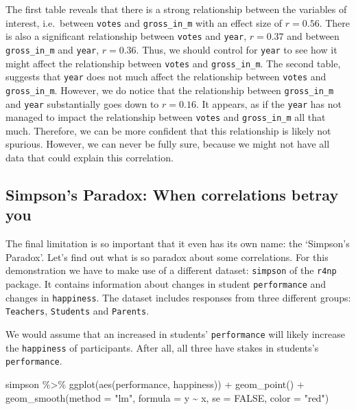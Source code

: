 \documentclass[
]{book}
\newenvironment{Shaded}{\begin{snugshade}}{\end{snugshade}}
\newcommand{\AttributeTok}[1]{\textcolor[rgb]{0.77,0.63,0.00}{#1}}
\newcommand{\ConstantTok}[1]{\textcolor[rgb]{0.00,0.00,0.00}{#1}}
\newcommand{\FunctionTok}[1]{\textcolor[rgb]{0.00,0.00,0.00}{#1}}
\newcommand{\NormalTok}[1]{#1}
\newcommand{\SpecialCharTok}[1]{\textcolor[rgb]{0.00,0.00,0.00}{#1}}
\newcommand{\StringTok}[1]{\textcolor[rgb]{0.31,0.60,0.02}{#1}}
\begin{document}
The first table reveals that there is a strong relationship between the variables of interest, i.e.~between \texttt{votes} and \texttt{gross\_in\_m} with an effect size of \(r = 0.56\). There is also a significant relationship between \texttt{votes} and \texttt{year}, \(r = 0.37\) and between \texttt{gross\_in\_m} and \texttt{year}, \(r = 0.36\). Thus, we should control for \texttt{year} to see how it might affect the relationship between \texttt{votes} and \texttt{gross\_in\_m}. The second table, suggests that \texttt{year} does not much affect the relationship between \texttt{votes} and \texttt{gross\_in\_m}. However, we do notice that the relationship between \texttt{gross\_in\_m} and \texttt{year} substantially goes down to \(r = 0.16\). It appears, as if the \texttt{year} has not managed to impact the relationship between \texttt{votes} and \texttt{gross\_in\_m} all that much. Therefore, we can be more confident that this relationship is likely not spurious. However, we can never be fully sure, because we might not have all data that could explain this correlation.

\hypertarget{simpsons-paradox}{%
\subsection{Simpson's Paradox: When correlations betray you}\label{simpsons-paradox}}

The final limitation is so important that it even has its own name: the `Simpson's Paradox'. Let's find out what is so paradox about some correlations. For this demonstration we have to make use of a different dataset: \texttt{simpson} of the \texttt{r4np} package. It contains information about changes in student \texttt{performance} and changes in \texttt{happiness}. The dataset includes responses from three different groups: \texttt{Teachers}, \texttt{Students} and \texttt{Parents}.

We would assume that an increased in students' \texttt{performance} will likely increase the \texttt{happiness} of participants. After all, all three have stakes in students's \texttt{performance}.

\begin{Shaded}
\begin{Highlighting}[]
\NormalTok{simpson }\SpecialCharTok{\%\textgreater{}\%} 
  \FunctionTok{ggplot}\NormalTok{(}\FunctionTok{aes}\NormalTok{(performance, happiness)) }\SpecialCharTok{+}
  \FunctionTok{geom\_point}\NormalTok{() }\SpecialCharTok{+}
  \FunctionTok{geom\_smooth}\NormalTok{(}\AttributeTok{method =} \StringTok{"lm"}\NormalTok{,}
              \AttributeTok{formula =}\NormalTok{ y }\SpecialCharTok{\textasciitilde{}}\NormalTok{ x,}
              \AttributeTok{se =} \ConstantTok{FALSE}\NormalTok{,}
              \AttributeTok{color =} \StringTok{"red"}\NormalTok{)}
\end{Highlighting}
\end{Shaded}
\end{document}
